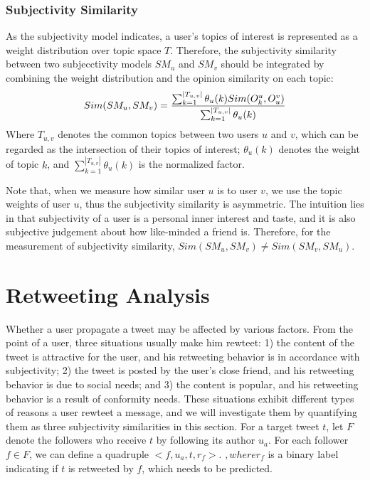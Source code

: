 \documentclass[letterpaper]{article}
\begin{document}
\subsubsection{Subjectivity Similarity}

As the subjectivity model indicates, a user's topics of interest is represented as a weight distribution over topic space $ T $. Therefore, the subjectivity similarity between two subjecctivity models $SM_u$ and $SM_v$ should be integrated by combining the weight distribution and the opinion similarity on each topic:
\begin{equation}
\label{subsim}
Sim(SM_{u},SM_{v})=\dfrac{\sum_{k=1}^{|T_{u,v}|}\theta_{u}(k)\* Sim(O_{k}^{u},O_{u}^{v})}{\sum_{k=1}^{|T_{u,v}|}\theta_{u}(k)}
\end{equation}
Where $ T_{u,v} $ denotes the common topics between two users $ u $ and $ v $, which can be regarded as the intersection of their topics of interest; $ \theta_{u}(k) $ denotes the weight of topic $ k $, and $ \sum_{k=1}^{|T_{u,v}|}\theta_{u}(k) $ is the normalized factor.

Note that, when we measure how similar user $ u $ is to user $ v $, we use the topic weights of user $ u $, thus the subjectivity similarity is asymmetric. The intuition lies in that subjectivity of a user is a personal inner interest and taste, and it is also subjective judgement about how like-minded a friend is. Therefore, for the measurement of subjectivity similarity, $ Sim(SM_u,SM_v)\neq Sim(SM_v,SM_u)$.

\section{Retweeting Analysis}
\label{retweet}

Whether a user propagate a tweet may be affected by various factors. 
From the point of a user, three situations usually make him rewteet: 1) the content of the tweet is attractive for the user, and his retweeting behavior is in accordance with subjectivity; 2) the tweet is posted by the user's close friend, and his retweeting behavior is due to social needs; and 3) the content is popular, and his retweeting behavior is a result of conformity needs\cite{cialdini2004social}. These situations exhibit different types of reasons a user rewteet a message, and   we will investigate them by quantifying them as three subjectivity similarities in this section. 
For a target tweet $ t $, let $ F $ denote the followers who receive $ t $ by following its author $ u_{a} $. 
For each follower $ f \in F $, we can define a quadruple $ <f, u_{a}, t, r_{f}>  $. $, where r_{f} $ is a binary label indicating if $ t $ is retweeted by $ f $, which needs to be predicted.
\end{document}
